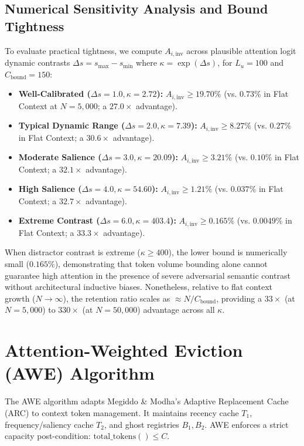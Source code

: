 \documentclass[11pt,a4paper]{article}
\begin{document}
\subsection{Numerical Sensitivity Analysis and Bound Tightness}
To evaluate practical tightness, we compute $A_{i, \text{inv}}$ across plausible attention logit dynamic contrasts $\Delta s = s_{\max} - s_{\min}$ where $\kappa = \exp(\Delta s)$, for $L_u = 100$ and $C_{\text{bound}} = 150$:
\begin{itemize}
    \item \textbf{Well-Calibrated ($\Delta s = 1.0, \kappa = 2.72$):} $A_{i,\text{inv}} \ge 19.70\%$ (vs. $0.73\%$ in Flat Context at $N=5{,}000$; a $27.0\times$ advantage).
    \item \textbf{Typical Dynamic Range ($\Delta s = 2.0, \kappa = 7.39$):} $A_{i,\text{inv}} \ge 8.27\%$ (vs. $0.27\%$ in Flat Context; a $30.6\times$ advantage).
    \item \textbf{Moderate Salience ($\Delta s = 3.0, \kappa = 20.09$):} $A_{i,\text{inv}} \ge 3.21\%$ (vs. $0.10\%$ in Flat Context; a $32.1\times$ advantage).
    \item \textbf{High Salience ($\Delta s = 4.0, \kappa = 54.60$):} $A_{i,\text{inv}} \ge 1.21\%$ (vs. $0.037\%$ in Flat Context; a $32.7\times$ advantage).
    \item \textbf{Extreme Contrast ($\Delta s = 6.0, \kappa = 403.4$):} $A_{i,\text{inv}} \ge 0.165\%$ (vs. $0.0049\%$ in Flat Context; a $33.3\times$ advantage).
\end{itemize}
\noindent When distractor contrast is extreme ($\kappa \ge 400$), the lower bound is numerically small ($0.165\%$), demonstrating that token volume bounding alone cannot guarantee high attention in the presence of severe adversarial semantic contrast without architectural inductive biases. Nonetheless, relative to flat context growth ($N \to \infty$), the retention ratio scales as $\approx N / C_{\text{bound}}$, providing a $33\times$ (at $N=5{,}000$) to $330\times$ (at $N=50{,}000$) advantage across all $\kappa$.

\section{Attention-Weighted Eviction (AWE) Algorithm}
\label{sec:awe}

The AWE algorithm adapts Megiddo \& Modha's Adaptive Replacement Cache (ARC) to context token management. It maintains recency cache $T_1$, frequency/saliency cache $T_2$, and ghost registries $B_1, B_2$. AWE enforces a strict capacity post-condition: $\text{total\_tokens}() \le C$.
\end{document}
